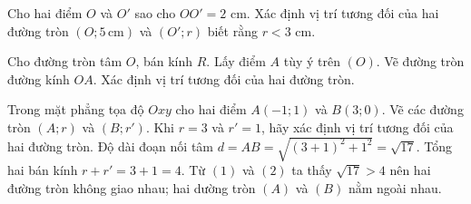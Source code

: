 \begin{vd}
	Cho hai điểm $O$ và $O'$ sao cho $OO'=2$ cm. Xác định vị trí tương đối của hai đường tròn $\left(O;5\,\text{cm} \right)$ và $\left(O';r \right)$ biết rằng $r<3$ cm.
\end{vd}
\begin{vd}%
	Cho đường tròn tâm $O$, bán kính $R$. Lấy điểm $A$ tùy ý trên $(O)$. Vẽ đường tròn đường kính $OA$. Xác định vị trí tương đối của hai đường tròn.
	\loigiai
	{
	}
\end{vd}
\begin{vd}%
	Trong mặt phẳng tọa độ $Oxy$ cho hai điểm $A(-1;1)$ và $B(3;0)$. Vẽ các đường tròn $(A;r)$ và $(B;r')$. Khi $r=3$ và $r'=1$, hãy xác định vị trí tương đối của hai đường tròn.
	\loigiai
	{
	Độ dài đoạn nối tâm $d=AB=\sqrt{(3+1)^2+1^2}=\sqrt{17}$. 
	Tổng hai bán kính $r+r'=3+1=4$. 
	Từ $(1)$ và $(2)$ ta thấy $\sqrt{17}>4$ nên hai đường tròn không giao nhau; hai dường tròn $(A)$ và $(B)$ nằm ngoài nhau.
	}
\end{vd}
